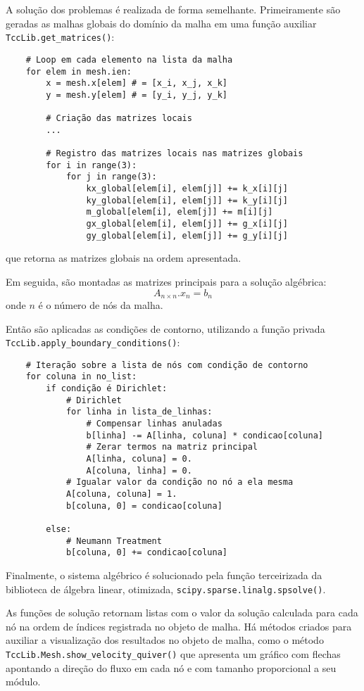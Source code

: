 A solução dos problemas é realizada de forma semelhante.
Primeiramente são geradas as malhas globais do domínio da malha em uma função auxiliar \verb|TccLib.get_matrices()|:
\begin{verbatim}
    # Loop em cada elemento na lista da malha
    for elem in mesh.ien:
        x = mesh.x[elem] # = [x_i, x_j, x_k]
        y = mesh.y[elem] # = [y_i, y_j, y_k]

        # Criação das matrizes locais
        ...

        # Registro das matrizes locais nas matrizes globais
        for i in range(3):
            for j in range(3):
                kx_global[elem[i], elem[j]] += k_x[i][j]
                ky_global[elem[i], elem[j]] += k_y[i][j]
                m_global[elem[i], elem[j]] += m[i][j]
                gx_global[elem[i], elem[j]] += g_x[i][j]
                gy_global[elem[i], elem[j]] += g_y[i][j]
\end{verbatim}
que retorna as matrizes globais na ordem apresentada.

Em seguida, são montadas as matrizes principais para a solução algébrica:
\begin{equation}
    A_{n\times n}.x_{n} = b_{n}
\end{equation}
onde $n$ é o número de nós da malha.

Então são aplicadas as condições de contorno, utilizando a função privada \verb|TccLib.apply_boundary_conditions()|:
\begin{verbatim}
    # Iteração sobre a lista de nós com condição de contorno
    for coluna in no_list:
        if condição é Dirichlet:
            # Dirichlet
            for linha in lista_de_linhas:
                # Compensar linhas anuladas
                b[linha] -= A[linha, coluna] * condicao[coluna]
                # Zerar termos na matriz principal
                A[linha, coluna] = 0.
                A[coluna, linha] = 0.
            # Igualar valor da condição no nó a ela mesma
            A[coluna, coluna] = 1.
            b[coluna, 0] = condicao[coluna]

        else:
            # Neumann Treatment
            b[coluna, 0] += condicao[coluna]
\end{verbatim}

Finalmente, o sistema algébrico é solucionado pela função terceirizada da biblioteca de álgebra linear, otimizada, \verb|scipy.sparse.linalg.spsolve()|.

As funções de solução retornam listas com o valor da solução calculada para cada nó na ordem de índices registrada no objeto de malha.
Há métodos criados para auxiliar a visualização dos resultados no objeto de malha, como o método \verb|TccLib.Mesh.show_velocity_quiver()| que apresenta um gráfico com flechas apontando a direção do fluxo em cada nó e com tamanho proporcional a seu módulo.


